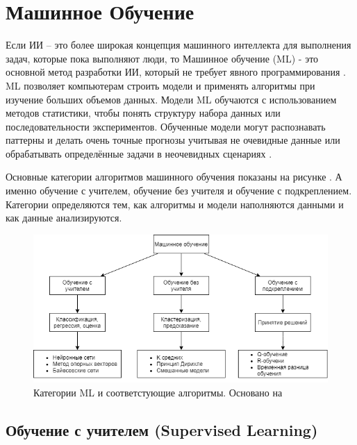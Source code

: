 \section{Машинное Обучение} \label{ch1:ml}

Если ИИ – это более широкая концепция машинного интеллекта для выполнения задач, которые пока выполняют люди, то Машинное обучение (ML) - это основной метод разработки ИИ, который не требует явного программирования \cite{Samuel-SomeStudies}. ML позволяет компьютерам строить модели и применять алгоритмы при изучение больших объемов данных. Модели ML обучаются с использованием методов статистики, чтобы понять структуру набора данных или последовательности экспериментов. Обученные модели могут распознавать паттерны и делать очень точные прогнозы учитывая не очевидные данные или обрабатывать определённые задачи в неочевидных сценариях \cite{bishop06pattern}.

Основные категории алгоритмов машинного обучения показаны на рисунке . А именно обучение с учителем, обучение без учителя и обучение с подкреплением.
Категории определяются тем, как алгоритмы и модели наполняются данными и как данные анализируются.

\begin{figure}[ht!] 
	\center
	\includegraphics [scale=0.60] {my_folder/images/ch1/ML-categories.png}
	\caption{Категории ML и соответстующие алгоритмы. Основано на \cite{Sultan_2018}} 
	\label{fig:ch1-ML-categories}
\end{figure}

\subsection{Обучение с учителем (Supervised Learning)}

